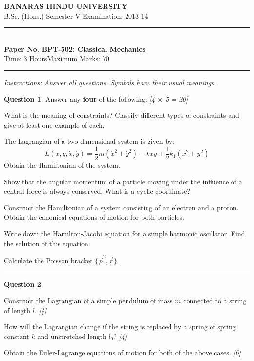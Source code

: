 \documentclass[11pt,a4paper]{article}
\newcommand{\pts}[1]{\hfill   \textit{[#1]}}
\begin{document}
\begin{center}
  {\large\bfseries BANARAS HINDU UNIVERSITY}\\[2pt]
  {\normalsize B.Sc. (Hons.) Semester V Examination, 2013-14}\\[6pt]
  \rule{0.8\linewidth}{0.5pt}\\[6pt]
  {\large\bfseries Paper No. BPT-502: Classical Mechanics}\\[4pt]
  {\normalsize Time: 3 Hours\hfill Maximum Marks: 70}
\end{center}
\rule{\linewidth}{0.4pt}
\smallskip



\noindent   \textit{Instructions: Answer all questions. Symbols have their usual meanings.}
\bigskip




\noindent   \textbf{Question 1.} Answer any   \textbf{four} of the following: \pts{4 $ \times$ 5 = 20}

\begin{parts}
  \item What is the meaning of constraints? Classify different types of constraints and give at least one example of each.
  \item The Lagrangian of a two-dimensional system is given by:
    \[ L(x, y, \dot{x}, \dot{y}) = \frac{1}{2} m (\dot{x}^2 + \dot{y}^2) - kxy + \frac{1}{2} k_1 (x^2 + y^2) \]
    Obtain the Hamiltonian of the system.
  \item Show that the angular momentum of a particle moving under the influence of a central force is always conserved. What is a cyclic coordinate?
  \item Construct the Hamiltonian of a system consisting of an electron and a proton. Obtain the canonical equations of motion for both particles.
  \item Write down the Hamilton-Jacobi equation for a simple harmonic oscillator. Find the solution of this equation.
  \item Calculate the Poisson bracket $\{\vec{p}^2, \vec{r}\}$.
\end{parts}

\medskip\rule{\linewidth}{0.2pt}




\noindent   \textbf{Question 2.}

\begin{parts}
  \item Construct the Lagrangian of a simple pendulum of mass $m$ connected to a string of length $l$. \pts{4}
  \item How will the Lagrangian change if the string is replaced by a spring of spring constant $k$ and unstretched length $l_0$? \pts{4}
  \item Obtain the Euler-Lagrange equations of motion for both of the above cases. \pts{6}
\end{parts}
\end{document}
